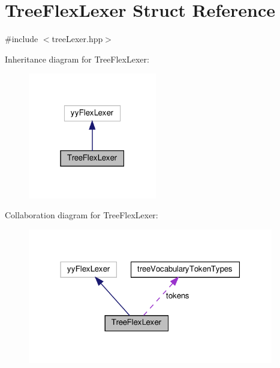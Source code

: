 \hypertarget{structTreeFlexLexer}{}\section{Tree\+Flex\+Lexer Struct Reference}
\label{structTreeFlexLexer}


{\ttfamily \#include $<$tree\+Lexer.\+hpp$>$}



Inheritance diagram for Tree\+Flex\+Lexer\+:
\nopagebreak
\begin{figure}[H]
\begin{center}
\leavevmode
\includegraphics[width=159pt]{d8/d94/structTreeFlexLexer__inherit__graph}
\end{center}
\end{figure}


Collaboration diagram for Tree\+Flex\+Lexer\+:
\nopagebreak
\begin{figure}[H]
\begin{center}
\leavevmode
\includegraphics[width=304pt]{d2/de6/structTreeFlexLexer__coll__graph}
\end{center}
\end{figure}
